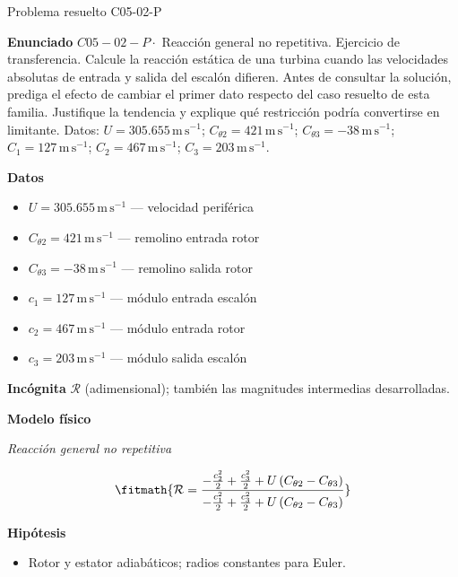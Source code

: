 \documentclass[10pt,openany]{book}
\begin{document}
\begin{studiumworked}{Problema resuelto C05-02-P}


\noindent\textbf{Enunciado}
\(C05-02-P \cdot\) Reacción general no repetitiva. Ejercicio de transferencia. Calcule la reacción estática de una turbina cuando las velocidades absolutas de entrada y salida del escalón difieren. Antes de consultar la solución, prediga el efecto de cambiar el primer dato respecto del caso resuelto de esta familia. Justifique la tendencia y explique qué restricción podría convertirse en limitante. Datos: \(U=305.655\, \mathrm{m}\,\mathrm{s}^{-1}\); \(C_{\theta2}=421\, \mathrm{m}\,\mathrm{s}^{-1}\); \(C_{\theta3}=-38\, \mathrm{m}\,\mathrm{s}^{-1}\); \(C_1=127\, \mathrm{m}\,\mathrm{s}^{-1}\); \(C_2=467\, \mathrm{m}\,\mathrm{s}^{-1}\); \(C_3=203\, \mathrm{m}\,\mathrm{s}^{-1}\).

\noindent\textbf{Datos}
\begin{itemize}
\item $U = 305.655\,\mathrm{m}\,\mathrm{s}^{-1}$ — velocidad periférica
\item $C_{\theta 2} = 421\,\mathrm{m}\,\mathrm{s}^{-1}$ — remolino entrada rotor
\item $C_{\theta 3} = -38\,\mathrm{m}\,\mathrm{s}^{-1}$ — remolino salida rotor
\item $c_{1} = 127\,\mathrm{m}\,\mathrm{s}^{-1}$ — módulo entrada escalón
\item $c_{2} = 467\,\mathrm{m}\,\mathrm{s}^{-1}$ — módulo entrada rotor
\item $c_{3} = 203\,\mathrm{m}\,\mathrm{s}^{-1}$ — módulo salida escalón
\end{itemize}

\noindent\textbf{Incógnita}
$\mathcal{R}$ (adimensional); también las magnitudes intermedias desarrolladas.

\noindent\textbf{Modelo físico}

\noindent\textit{Reacción general no repetitiva}

\[
\fitmath{\mathcal R=\frac{- \frac{c_{2}^{2}}{2} + \frac{c_{3}^{2}}{2} + U \left(C_{\theta 2} - C_{\theta 3}\right)}{- \frac{c_{1}^{2}}{2} + \frac{c_{3}^{2}}{2} + U \left(C_{\theta 2} - C_{\theta 3}\right)}}
\]

\noindent\textbf{Hipótesis}
\begin{itemize}
\item Rotor y estator adiabáticos; radios constantes para Euler.
\end{itemize}


\end{studiumworked}
\end{document}
